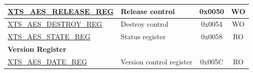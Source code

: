 \begin{longtable}{ | p{6.0cm} | p{6.6cm} | c | c| }
\hyperref[regdesc:XTSAESRELEASEREG]        {XTS\_AES\_RELEASE\_REG          }  & Release control         & 0x0050 & WO \\\hline
\hyperref[regdesc:XTSAESDESTROYREG]        {XTS\_AES\_DESTROY\_REG          }  & Destroy control         & 0x0054 & WO \\\hline
\hyperref[regdesc:XTSAESSTATEREG]          {XTS\_AES\_STATE\_REG            }  & Status register       & 0x0058 & RO \\\hline
\multicolumn{4}{|l|}{\textbf{Version Register}} \\ \hline
\hyperref[regdesc:XTSAESDATEREG]           {XTS\_AES\_DATE\_REG             }  & Version control register   & 0x005C & RO \\\hline

\end{longtable}
